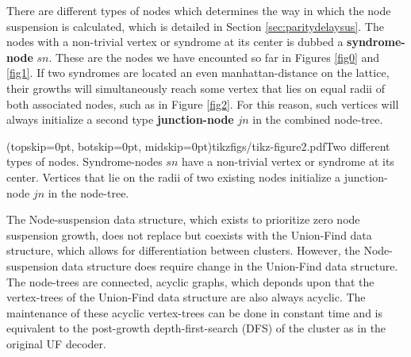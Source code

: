 There are different types of nodes which determines the way in which the node suspension is calculated, which is detailed in Section \ref{sec:paritydelaysus}. The nodes with a non-trivial vertex or syndrome at its center is dubbed a \textbf{syndrome-node} $sn$. These are the nodes we have encounted so far in Figures \ref{fig0} and \ref{fig1}. If two syndromes are located an even manhattan-distance on the lattice, their growths will simultaneously reach some vertex that lies on equal radii of both associated nodes, such as in Figure \ref{fig2}. For this reason, such vertices will always initialize a second type \textbf{junction-node} $jn$ in the combined node-tree.

\Figure[htb](topskip=0pt, botskip=0pt, midskip=0pt){tikzfigs/tikz-figure2.pdf}{Two different types of nodes. Syndrome-nodes $sn$ have a non-trivial vertex or syndrome at its center. Vertices that lie on the radii of two existing nodes initialize a junction-node $jn$ in the node-tree.\label{fig2}}

The Node-suspension data structure, which exists to prioritize zero node suspension growth, does not replace but coexists with the Union-Find data structure, which allows for differentiation between clusters. However, the Node-suspension data structure does require change in the Union-Find data structure. The node-trees are connected, acyclic graphs, which deponds upon that the vertex-trees of the Union-Find data structure are also always acyclic. The maintenance of these acyclic vertex-trees can be done in constant time and is equivalent to the post-growth depth-first-search (DFS) of the cluster as in the original UF decoder. 
